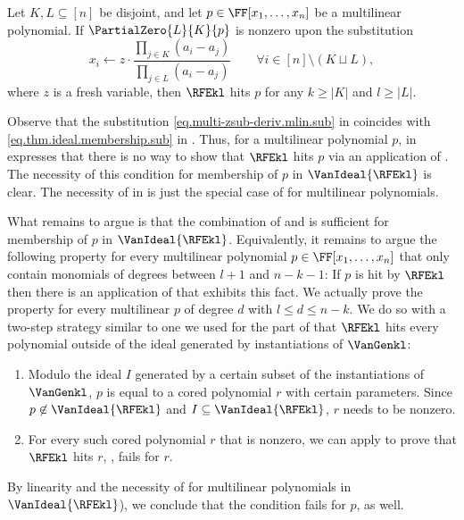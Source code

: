 \documentclass{toc}
\begin{document}
\begin{lemma}\label{lem.multi-zsub-deriv.mlin}
  Let \(K,L \subseteq [n]\) be disjoint,
  and
  let \(p\in\FF[x_1,\ldots,x_n]\) be a multilinear polynomial.
  If
  \(\PartialZero{L}{K}{p}\)
  is nonzero upon the substitution
  \begin{equation}
    \label{eq.multi-zsub-deriv.mlin.sub}
    x_i \gets
    z \cdot
      \frac{
        \prod_{j\in K} ( a_i - a_{j} )
      }{
        \prod_{j\in L} ( a_i - a_{j} )
      }
      \qquad \forall i\in [n]\setminus (K\sqcup L),
  \end{equation}
  where $z$ is a fresh variable,
  then \(\RFEkl\) hits \(p\) for any \(k\ge|K|\) and \(l\ge|L|\).
\end{lemma}

Observe that the substitution \eqref{eq.multi-zsub-deriv.mlin.sub} in  coincides with \eqref{eq.thm.ideal.membership.sub} in . Thus, for a multilinear polynomial $p$,  in  expresses that there is no way to show that $\RFEkl$ hits $p$ via an application of . The necessity of this condition for membership of $p$ in $\VanIdeal{\RFEkl}$ is clear. 
The necessity of  in  is just the special case of  for multilinear polynomials. 

What remains to argue is that the combination of  and  is sufficient for membership of $p$ in $\VanIdeal{\RFEkl}$. Equivalently, it remains to argue the following property for every multilinear polynomial $p \in \FF[x_1,\dots,x_n]$ that only contain monomials of degrees between $l+1$ and $n-k-1$: If $p$ is hit by $\RFEkl$ then there is an application of  that exhibits this fact. We actually prove the property for every multilinear $p$ of degree $d$ with $l \le d \le n-k$. We do so with a two-step strategy similar to one we used for the part of  that $\RFEkl$ hits every polynomial outside of the ideal generated by instantiations of $\VanGenkl$:
\begin{enumerate}
  \item
    Modulo the ideal $I$ generated by a certain subset of the instantiations of $\VanGenkl$, 
    $p$ is equal
    to a cored polynomial $r$ with certain parameters. Since $p \not\in \VanIdeal{\RFEkl}$ and $I \subseteq \VanIdeal{\RFEkl}$, $r$ needs to be nonzero. 
  \item
    For every such cored polynomial $r$ that is nonzero, we can apply  to prove that $\RFEkl$ hits $r$, \ie,  fails for $r$.
\end{enumerate}
By linearity and the necessity of  for multilinear polynomials in $\VanIdeal{\RFEkl}$), we conclude that the condition fails for $p$, as well.
\end{document}
